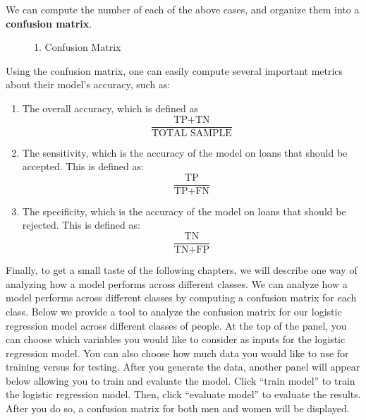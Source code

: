 \par We can compute the number of each of the above cases, and organize them into a \textbf{confusion matrix}.
\begin{figure}
    \caption{1. Confusion Matrix}
\end{figure}
\par Using the confusion matrix, one can easily compute several important metrics about their model’s accuracy, such as:
\begin{enumerate}
\item The overall accuracy, which is defined as
		$$ \frac{\text{TP} + \text{TN}}{\text{TOTAL SAMPLE}} $$
\item The sensitivity, which is the accuracy of the model on loans that should be accepted. This is defined as:
		$$ \frac{\text{TP}}{\text{TP}+\text{FN}} $$
\item The specificity, which is the accuracy of the model on loans that should be rejected. This is defined as:
		$$\frac{\text{TN}}{\text{TN}+\text{FP}} $$
\end{enumerate}
\par Finally, to get a small taste of the following chapters, we will describe one way of analyzing how a model performs across different classes. We can analyze how a model performs across different classes by computing a confusion matrix for each class. Below we provide a tool to analyze the confusion matrix for our logistic regression model across different classes of people. At the top of the panel, you can choose which variables you would like to consider as inputs for the logistic regression model. You can also choose how much data you would like to use for training versus for testing. After you generate the data, another panel will appear below allowing you to train and evaluate the model. Click “train model” to train the logistic regression model. Then, click “evaluate model” to evaluate the results. After you do so, a confusion matrix for both men and women will be displayed.

\begin{VCSet}
    \begin{visualComponent}
    \end{visualComponent}

    \begin{visualComponent}
    \end{visualComponent}
\end{VCSet}








